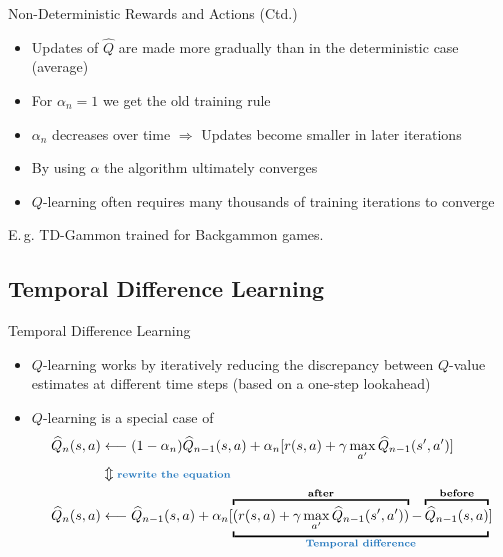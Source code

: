 \begin{frame}{Non-Deterministic Rewards and Actions (Ctd.)}{}
	\begin{itemize}
		\item Updates of $\widehat{Q}$ are made more gradually than in the deterministic case (average)
		\item For $\alpha_n = 1$ we get the old training rule
		\item $\alpha_n$ decreases over time $\Rightarrow$ Updates become smaller in later iterations
		\item By using $\alpha$ the algorithm ultimately converges
		\item $Q$-learning often requires many thousands of training iterations to converge
	\end{itemize}
	
	\begin{boxBlueNoFrame}
		E.\,g. TD-Gammon trained for  Backgammon games.
	\end{boxBlueNoFrame}
\end{frame}


\subsection{Temporal Difference Learning}

\begin{frame}{Temporal Difference Learning}{}
	\begin{itemize}
		\item $Q$-learning works by iteratively reducing the discrepancy between $Q$-value estimates at different time steps
			(based on a one-step lookahead)
		\item $Q$-learning is a special case of 
		\begin{align*}
			\widehat{Q}_n(s, a) 	&\longleftarrow (1 - \alpha_n) \widehat{Q}_{n-1}(s, a) + \alpha_n[r(s, a) +
				\gamma \max_{a'} \widehat{Q}_{n-1}(s', a')] \\
								&\Updownarrow \text{\scriptsize \highlight{rewrite the equation}} \\
			\widehat{Q}_n(s, a) 	&\longleftarrow \widehat{Q}_{n-1}(s, a) +
				\alpha_n[
					\underbracket{
						\overbracket{(r(s, a) + \gamma \max_{a'} \widehat{Q}_{n-1}(s', a'))}^{\text{\textbf{after}}} -
						\overbracket{\widehat{Q}_{n-1}(s, a)}^{\text{\textbf{before}}}
					}_{\text{\highlight{Temporal difference}}}]
		\end{align*}
	\end{itemize}
\end{frame}


